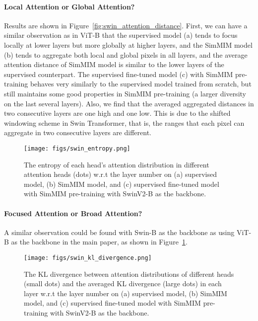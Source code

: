 \documentclass{article}
\begin{document}
\paragraph{Local Attention or Global Attention?} Results are shown in  Figure~\ref{fig:swin_attention_distance}.
First, we can have a similar observation as in ViT-B that the supervised model (a) tends to focus locally at lower layers but more globally at higher layers, and the SimMIM model (b) tends to aggregate both local and global pixels in all layers, and the average attention distance of SimMIM model is similar to the lower layers of the supervised counterpart.
The supervised fine-tuned model (c) with SimMIM pre-training behaves very similarly to the supervised model trained from scratch, but still maintains some good properties in SimMIM pre-training (a larger diversity on the last several layers). 
Also, we find that the averaged aggregated distances in two consecutive layers are one high and one low. This is due to the shifted windowing scheme in Swin Transformer, that is, the ranges that each pixel can aggregate in two consecutive layers are different.



\begin{figure}[h]
    \centering
    \texttt{[image: figs/swin\_entropy.png]}
  \vspace{-2.0em}
    \caption{The entropy of each head’s attention distribution in different attention heads (dots) w.r.t the layer number on (a) supervised model, (b) SimMIM model, and (c) supervised fine-tuned model with SimMIM pre-training with SwinV2-B as the backbone.}
    \label{fig:swin_entropy}
\end{figure}

\paragraph{Focused Attention or Broad Attention?} A similar observation could be found with Swin-B as the backbone as using ViT-B as the backbone in the main paper, as shown in Figure~\ref{fig:swin_entropy}. 

\begin{figure}[h]
    \centering
    \texttt{[image: figs/swin\_kl\_divergence.png]}
  \vspace{-2.0em}
    \caption{The KL divergence between attention distributions of different heads (small dots) and the averaged KL divergence (large dots) in each layer w.r.t the layer number on (a) supervised model, (b) SimMIM model, and (c) supervised fine-tuned model with SimMIM pre-training with SwinV2-B as the backbone.}
    \label{fig:swin_kl_divergence}
\end{figure}
\end{document}
